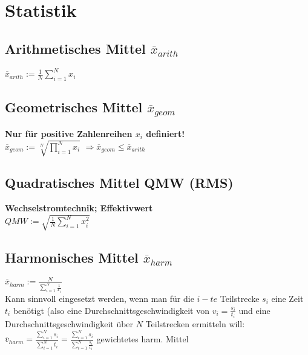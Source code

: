 \section{Statistik}
	\subsection{Arithmetisches Mittel $\overline{x}_{arith}$}
		
	$\overline{x}_{arith} := \frac{1}{N} \sum \limits_{i = 1}^N  x_i$
	
		
		
	\subsection{Geometrisches Mittel $\overline{x}_{geom}$}
	\textbf{Nur für positive Zahlenreihen $x_i$ definiert!} \\

	$\overline{x}_{geom} := \sqrt[N]{\prod \limits_{i = 1}^N  x_i }$ \qquad \qquad $\Rightarrow \overline{x}_{geom} \leq \overline{x}_{arith}$
		
		
		
	\subsection{Quadratisches Mittel QMW (RMS)}
	\textbf{Wechselstromtechnik; Effektivwert} \\

	$QMW := \sqrt{ \frac{1}{N} \sum \limits_{i = 1}^N  x_i^2 }$
		
		
	\subsection{Harmonisches Mittel $\overline{x}_{harm}$}		
	
	$\overline{x}_{harm} := \frac{N}{ \sum \limits_{i = 1}^N   \frac{1}{x_i} } $ \\

	Kann sinnvoll eingesetzt werden, wenn man für die $i-te$ Teilstrecke $s_i$ eine Zeit $t_i$ benötigt (also eine Durchschnittsgeschwindigkeit von $v_i = \frac{s_i}{t_i}$ und eine Durchschnittsgeschwindigkeit über $N$ Teilstrecken ermitteln will: \\

	$\overline{v}_{harm} = \frac{\sum \limits_{i = 1}^N  s_i }{\sum \limits_{i = 1}^N  t_i} = \frac{\sum \limits_{i = 1}^N  s_i }{\sum \limits_{i = 1}^N \frac{s_i}{v_i} }  $ \qquad gewichtetes harm. Mittel
		
